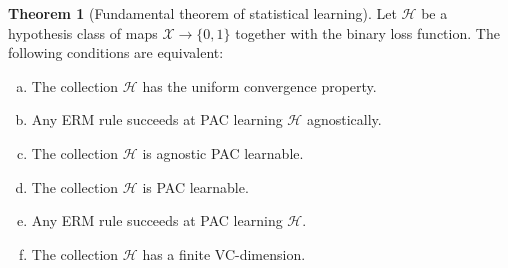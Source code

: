 \documentclass[11pt, reqno]{amsart}
\theoremstyle{definition}
\newtheorem{theorem}{Theorem}[section]
\newtheorem{definition}[theorem]{Definition}
\renewcommand{\leq}{\leqslant}
\newcommand{\N}{\mathbf{N}}
\begin{document}
\begin{theorem}[Fundamental theorem of statistical learning]
\label{thm:fundamental-thm-stat-learning}
Let \(\mathcal{H}\) be a hypothesis class of maps \(\mathcal{X} \to \{0, 1\}\) together with the
binary loss function. The following conditions are equivalent:
\begin{enumerate}[(a)]\setlength\itemsep{0em}
\item The collection \(\mathcal{H}\) has the uniform convergence property.

\item Any ERM rule succeeds at PAC learning \(\mathcal{H}\) agnostically.

\item The collection \(\mathcal{H}\) is agnostic PAC learnable.

\item The collection \(\mathcal{H}\) is PAC learnable.

\item Any ERM rule succeeds at PAC learning \(\mathcal{H}\).

\item The collection \(\mathcal{H}\) has a finite VC-dimension.
\end{enumerate}
\end{theorem}



\end{document}
